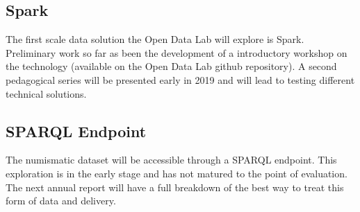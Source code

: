 \subsection{Spark}
The first scale data solution the Open Data Lab will explore is Spark. Preliminary work so far as been the development of a introductory workshop on the technology (available on the Open Data Lab github repository). A second pedagogical series will be presented early in 2019 and will lead to testing different technical solutions.
\subsection{SPARQL Endpoint}
The numismatic dataset will be accessible through a SPARQL endpoint. This exploration is in the early stage and has not matured to the point of evaluation. The next annual report will have a full breakdown of the best way to treat this form of data and delivery.

